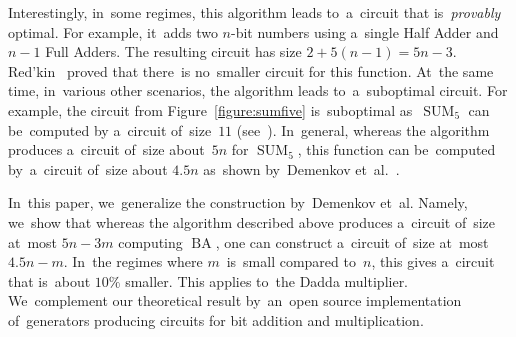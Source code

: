 \documentclass[sigconf, review, anonymous]{acmart}
\DeclareMathOperator{\SUM}{SUM}
\DeclareMathOperator{\BA}{BA}
\begin{document}
Interestingly, in~some regimes, this algorithm leads to~a~circuit 
that is~\emph{provably} optimal. For example, it~adds two $n$-bit 
numbers using a~single Half Adder and $n-1$ Full Adders. The resulting
circuit has size $2+5(n-1)=5n-3$. Red'kin~\cite{Red81} proved
that there~is no~smaller circuit for this function.
At~the same time, in~various other scenarios, the algorithm leads 
to~a~suboptimal circuit. For example, the circuit from Figure~\ref{figure:sumfive} is~suboptimal as~$\SUM_5$
can be~computed by a~circuit of~size~$11$ (see~\cite{DBLP:conf/mfcs/KulikovPS22}).
In~general, whereas the algorithm produces a~circuit of~size about~$5n$
for $\SUM_5$, this function can be~computed by~a~circuit of~size about $4.5n$
as~shown by~Demenkov et~al.~\cite{DBLP:journals/ipl/DemenkovKKY10}.

In~this paper, we~generalize the construction by~Demenkov et~al.
Namely, we~show that whereas the algorithm described above produces
a~circuit of~size at~most $5n-3m$ computing $\BA$, one can construct
a~circuit of~size at~most $4.5n-m$. In~the regimes where $m$~is~small
compared to~$n$, this gives a~circuit that is~about $10\%$ smaller.
This applies to~the Dadda multiplier.
We~complement our theoretical result by~an~open source implementation
of~generators producing circuits for bit addition and multiplication.






\end{document}
